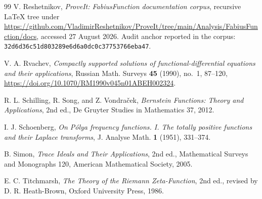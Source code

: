 \documentclass[11pt,oneside]{article}
\theoremstyle{definition}
\begin{document}
\begin{thebibliography}{99}
V. Reshetnikov,
\emph{ProveIt: FabiusFunction documentation corpus},
recursive LaTeX tree under
\url{https://github.com/VladimirReshetnikov/ProveIt/tree/main/Analysis/FabiusFunction/docs},
accessed 27 August 2026.  Audit anchor reported in the corpus:
\texttt{32d6d36c51d803289e6d6a0dc0c37753766eba47}.

V. A. Rvachev,
\emph{Compactly supported solutions of functional-differential equations and their applications},
Russian Math. Surveys \textbf{45} (1990), no.~1, 87--120,
\url{https://doi.org/10.1070/RM1990v045n01ABEH002324}.

R. L. Schilling, R. Song, and Z. Vondra\v cek,
\emph{Bernstein Functions: Theory and Applications},
2nd ed., De Gruyter Studies in Mathematics 37, 2012.

I. J. Schoenberg,
\emph{On P\'olya frequency functions. I. The totally positive functions and their Laplace transforms},
J. Analyse Math. \textbf{1} (1951), 331--374.

B. Simon,
\emph{Trace Ideals and Their Applications},
2nd ed., Mathematical Surveys and Monographs 120, American Mathematical Society,
2005.

E. C. Titchmarsh,
\emph{The Theory of the Riemann Zeta-Function},
2nd ed., revised by D. R. Heath-Brown, Oxford University Press, 1986.

\end{thebibliography}
\end{document}

